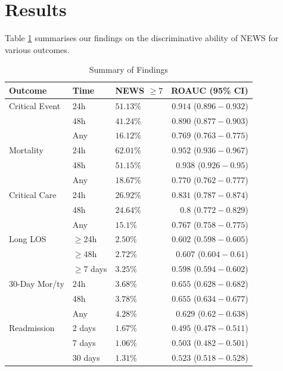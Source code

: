 \documentclass[10pt,journal, compsoc]{IEEEtran}
\begin{document}
\section{Results}
Table \ref{tab:result_summary} summarises our findings on the discriminative ability of NEWS for various outcomes.
\begin{table}[!t]
    \renewcommand{\arraystretch}{1.3}
    \centering
    \caption{Summary of Findings}
    \label{tab:result_summary}
    \begin{tabular}{lllr}
        \toprule
        Outcome        & Time         & NEWS $\geq 7$ & ROAUC (95\% CI)              \\
        \midrule
        Critical Event & 24h          & $51.13\%$     & $\bm{0.914}$ ($0.896-0.932$) \\
                       & 48h          & $41.24\%$     & $0.890$ ($0.877-0.903$)      \\
                       & Any          & $16.12\%$     & $0.769$ ($0.763-0.775$)      \\
        \hline
        Mortality      & 24h          & $62.01\%$     & $\bm{0.952}$ ($0.936-0.967$) \\
                       & 48h          & $51.15\%$     & $0.938$ ($0.926-0.95$)       \\
                       & Any          & $18.67\%$     & $0.770$ ($0.762-0.777$)      \\
        \hline
        Critical Care  & 24h          & $26.92\%$     & $\bm{0.831}$ ($0.787-0.874$) \\
                       & 48h          & $24.64\%$     & $0.8$ ($0.772-0.829$)        \\
                       & Any          & $15.1\%$      & $0.767$ ($0.758-0.775$)      \\
        \hline
        Long LOS       & $\geq$24h    & $2.50\%$      & $0.602$ ($0.598-0.605$)      \\
                       & $\geq$48h    & $2.72\%$      & $\bm{0.607}$ ($0.604-0.61$)  \\
                       & $\geq$7 days & $3.25\%$      & $0.598$ ($0.594-0.602$)      \\
        \hline
        30-Day Mor/ty  & 24h          & $3.68\%$      & $\bm{0.655}$ ($0.628-0.682$) \\
                       & 48h          & $3.78\%$      & $0.655$ ($0.634-0.677$)      \\
                       & Any          & $4.28\%$      & $0.629$ ($0.62-0.638$)       \\
        \hline
        Readmission    & 2 days       & $1.67\%$      & $0.495$ ($0.478-0.511$)      \\
                       & 7 days       & $1.06\%$      & $0.503$ ($0.482-0.501$)      \\
                       & 30 days      & $1.31\%$      & $0.523$ ($0.518-0.528$)      \\
        \bottomrule
    \end{tabular}
\end{table}
\end{document}

